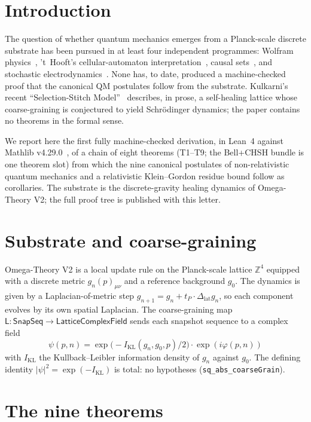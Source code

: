 \documentclass[aps,prl,twocolumn,superscriptaddress,nofootinbib,10pt]{revtex4-2}
\newcommand{\KL}{I_{\mathrm{KL}}}
\newcommand{\tP}{t_P}
\begin{document}
\section{Introduction}

The question of whether quantum mechanics emerges from a
Planck-scale discrete substrate has been pursued in at least four
independent programmes: Wolfram physics~\cite{Wolfram2020},
't~Hooft's cellular-automaton
interpretation~\cite{tHooft2014,tHooft2016}, causal
sets~\cite{BombelliLeeMeyerSorkin1987}, and stochastic
electrodynamics~\cite{dePenaCetto1996}. None has, to date, produced
a machine-checked proof that the canonical QM postulates follow from
the substrate. Kulkarni's recent ``Selection-Stitch
Model''~\cite{Kulkarni2026} describes, in prose, a self-healing
lattice whose coarse-graining is conjectured to yield Schr\"odinger
dynamics; the paper contains no theorems in the formal sense.

We report here the first fully machine-checked derivation, in Lean~4
against Mathlib v4.29.0~\cite{Mathlib4}, of a chain of eight theorems
(T1--T9; the Bell+CHSH bundle is one theorem slot) from which the
nine canonical postulates of non-relativistic quantum mechanics and
a relativistic Klein--Gordon residue bound follow as corollaries. The
substrate is the discrete-gravity healing dynamics of Omega-Theory V2;
the full proof tree is published with this letter.

\section{Substrate and coarse-graining}

Omega-Theory V2 is a local update rule on the Planck-scale lattice
$\mathbb{Z}^{4}$ equipped with a discrete metric $g_{n}(p)_{\mu\nu}$
and a reference background $g_{0}$. The dynamics is given by a
Laplacian-of-metric step
$g_{n+1}=g_{n}+\tP\cdot\Delta_{\mathrm{lat}}g_{n}$, so each
component evolves by its own spatial Laplacian. The coarse-graining
map $\mathsf{L}:\mathsf{SnapSeq}\to\mathsf{LatticeComplexField}$
sends each snapshot sequence to a complex field
\[
\psi(p,n)=\exp\!\bigl(-\KL(g_{n},g_{0},p)/2\bigr)\cdot\exp(i\varphi(p,n))
\]
with $\KL$ the Kullback--Leibler information density of $g_{n}$
against $g_{0}$. The defining identity
$|\psi|^{2}=\exp(-\KL)$ is total: no hypotheses
(\texttt{sq\_abs\_coarseGrain}).

\section{The nine theorems}
\end{document}

